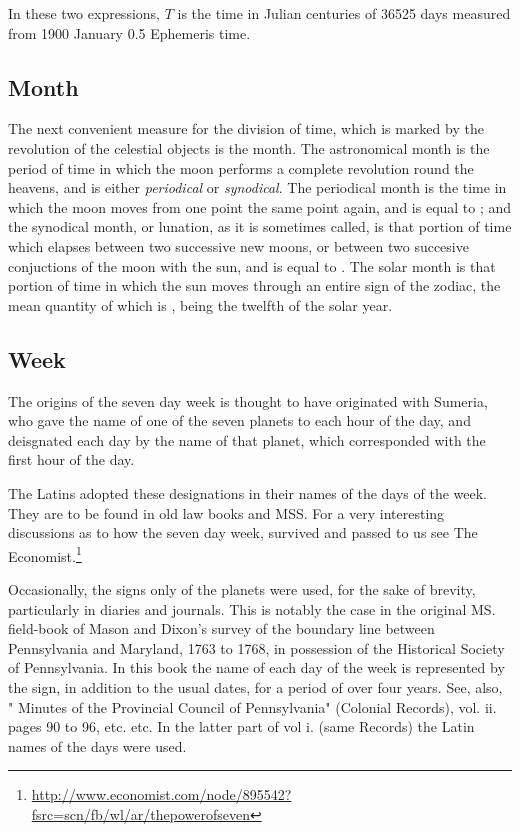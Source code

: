 In these two expressions, $T$ is the time in Julian centuries of 36525 days measured from 1900 January 0.5 Ephemeris time. 

\subsection{Month}

The next convenient measure for the division of time, which is marked by the revolution of the
celestial objects is the month. The astronomical month is the period of time in which the moon 
performs a complete revolution round the heavens, and is either \textit{periodical} or \textit{synodical}. The periodical
month is the time in which the moon moves from one point the same point again, and is equal to ; and the synodical month, or lunation, as it is sometimes called, is that portion of time which
elapses between two successive new moons, or between two succesive conjuctions of the moon with the sun, and is equal to .  The solar month is that portion of time in which the sun moves through an
entire sign of the zodiac, the mean quantity of which is , being the twelfth of the
solar year.


\subsection{Week}

The origins of the seven day week is thought to have originated with Sumeria, who gave the name
of one of the seven planets to each hour of the day, and deisgnated each day by the name of that planet, which corresponded with the first hour of the day. 

The Latins adopted these designations in their names of 
the days of the week. They are to be found in old law books 
and MSS. For a very interesting discussions as to how the seven
day week, survived and passed to us see The Economist.\footnote{\protect\url{http://www.economist.com/node/895542?fsrc=scn/fb/wl/ar/thepowerofseven}}

Occasionally, the signs only of the planets were used, for 
the sake of brevity, particularly in diaries and journals. This 
is notably the case in the original MS. field-book of Mason 
and Dixon's survey of the boundary line between Pennsylvania and Maryland, 1763 to 1768, 
in possession of the Historical 
Society of Pennsylvania. In this book the name of 
each day of the week is represented by the sign, in addition 
to the usual dates, for a period of over four years. See, also, 
" Minutes of the Provincial Council of Pennsylvania" (Colonial Records), vol. ii. pages 90 to 96, etc. etc. In the latter 
part of vol i. (same Records) the Latin names of the days 
were used. 

